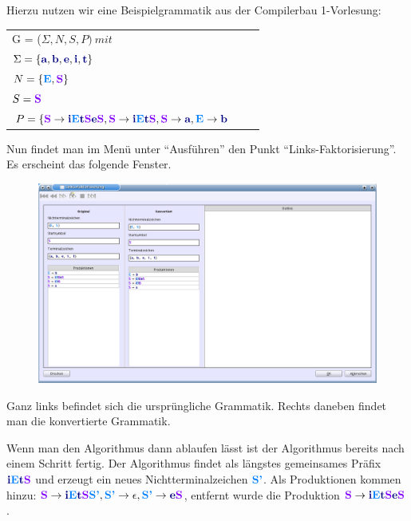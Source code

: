 Hierzu nutzen wir eine Beispielgrammatik aus der Compilerbau 1-Vorlesung:

\begin{tabular}{lcr}
G = ($\Sigma, N, S, P )\ mit $\\
$\Sigma = \{\TerminalSymbol{a}, \TerminalSymbol{b}, \TerminalSymbol{e},
\TerminalSymbol{i},\TerminalSymbol{t}\}$\\ $N =
\{\NonterminalSymbol{E}, \StartSymbol{S}\}$\\ $S=\StartSymbol{S}$\\
$P = \{\StartSymbol{S} \to \TerminalSymbol{i}\NonterminalSymbol{E}\TerminalSymbol{t}\StartSymbol{S}\TerminalSymbol{e}\StartSymbol{S},\StartSymbol{S} \to \TerminalSymbol{i}\NonterminalSymbol{E}\TerminalSymbol{t}\StartSymbol{S}, \StartSymbol{S} \to \TerminalSymbol{a}, \NonterminalSymbol{E} \to \TerminalSymbol{b}$\\
\end{tabular}

Nun findet man im Menü unter "`Ausführen"' den Punkt "`Links-Faktorisierung"'. Es erscheint das folgende Fenster.

\begin{figure}[h]
\begin{center}
\includegraphics[width=12cm]{../images/left_factoring.png}
\end{center}
\end{figure}

Ganz links befindet sich die ursprüngliche Grammatik. Rechts daneben findet man die konvertierte Grammatik.

Wenn man den Algorithmus dann ablaufen lässt ist der Algorithmus bereits nach einem Schritt fertig. Der Algorithmus findet als längstes gemeinsames Präfix $\TerminalSymbol{i}\NonterminalSymbol{E}\TerminalSymbol{t}\StartSymbol{S}$ und erzeugt ein neues Nichtterminalzeichen $\NonterminalSymbol{S'}$. Als Produktionen kommen hinzu: $\StartSymbol{S} \to \TerminalSymbol{i}\NonterminalSymbol{E}\TerminalSymbol{t}\StartSymbol{S}\NonterminalSymbol{S'}, \NonterminalSymbol{S'} \to \epsilon, \NonterminalSymbol{S'} \to \TerminalSymbol{e}\StartSymbol{S}$, entfernt wurde die Produktion $\StartSymbol{S} \to \TerminalSymbol{i}\NonterminalSymbol{E}\TerminalSymbol{t}\StartSymbol{S}\TerminalSymbol{e}\StartSymbol{S}$.
